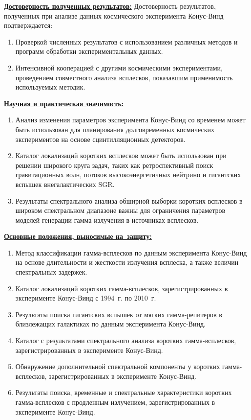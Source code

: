 \underline{\textbf{Достоверность полученных результатов:}}
Достоверность результатов, полученных при анализе данных космического
эксперимента Конус-Винд подтверждается:
\begin{enumerate}
\item Проверкой численных результатов с использованием различных методов и 
программ обработки экспериментальных данных.
\item Интенсивной кооперацией с другими космическими экспериментами,
проведением совместного анализа всплесков, показавшим применимость используемых методик.
\end{enumerate}

\underline{\textbf{Научная и практическая значимость:}} 
\begin{enumerate}
\item Анализ изменения параметров эксперимента Конус-Винд со временем может быть использован
 для планирования долговременных космических экспериментов на основе сцинтилляционных детекторов.
\item Каталог локализаций коротких всплесков может быть использован при решении 
 широкого круга задач, таких как ретроспективный поиск гравитационных волн, потоков высокоэнергетичных нейтрино 
 и гигантских вспышек внегалактических SGR.
\item Результаты спектрального анализа обширной выборки коротких всплесков 
в широком спектральном диапазоне важны для ограничения параметров
моделей генерации гамма-излучения в источниках всплесков.
\end{enumerate}

\underline{\textbf{Основные положения, выносимые на~защиту:}}
\begin{enumerate}
\item Метод классификации гамма-всплесков по данным эксперимента Конус-Винд на основе
    длительности и жесткости излучения всплеска, а также величин спектральных задержек.
\item Каталог локализаций коротких гамма-всплесков, зарегистрированных в эксперименте
    Конус-Винд с 1994~г. по 2010~г.
\item Результаты поиска гигантских вспышек от мягких гамма-репитеров 
    в близлежащих галактиках по данным эксперимента Конус-Винд. 
\item Каталог с результатами спектрального анализа коротких гамма-всплесков, 
    зарегистрированных в эксперименте Конус-Винд.
\item Обнаружение дополнительной спектральной компоненты у коротких гамма-всплесков, 
    зарегистрированных в эксперименте Конус-Винд.
\item Результаты поиска, временные и спектральные характеристики коротких гамма-всплесков 
    с продленным излучением, зарегистрированных в эксперименте Конус-Винд.
\end{enumerate}


